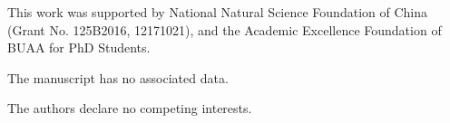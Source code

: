 \documentclass[sn-mathphys]{JORSC-jnl}%
\theoremstyle{thmstyleone}%
\theoremstyle{thmstylethree}%
\begin{document}
	









%
%
%
%
%
%
%
%

This work was supported by National Natural Science Foundation of China (Grant No. 125B2016, 12171021), and the Academic Excellence Foundation of BUAA for PhD Students.

The manuscript has no associated data.

The authors declare no competing interests.

%
\end{document}
